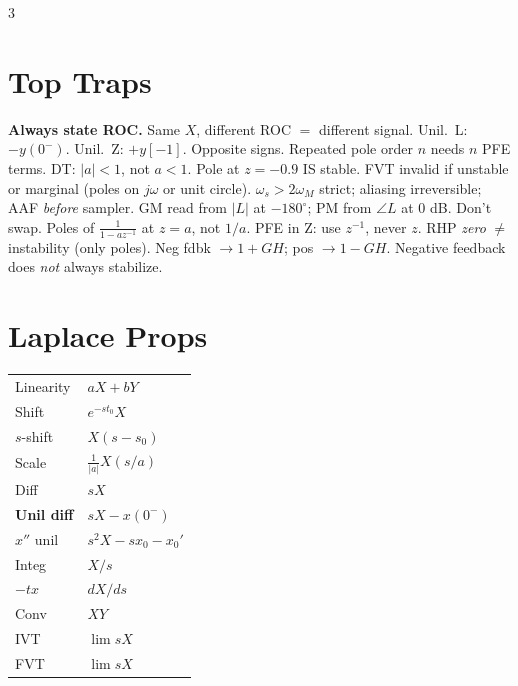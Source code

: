 \documentclass[11pt]{extarticle}
\begin{document}
\begin{paracol}{3}
\section*{Top Traps}
\textbf{Always state ROC.} Same $X$, different ROC $=$ different signal.
Unil.\ L: $\mathbf{-}y(0^-)$. Unil.\ Z: $\mathbf{+}y[-1]$. Opposite signs.
Repeated pole order $n$ needs $n$ PFE terms.
DT: $|a|{<}1$, not $a{<}1$. Pole at $z{=}{-}0.9$ IS stable.
FVT invalid if unstable or marginal (poles on $j\omega$ or unit circle).
$\omega_s>2\omega_M$ strict; aliasing irreversible; AAF \emph{before} sampler.
GM read from $|L|$ at $-180^\circ$; PM from $\angle L$ at 0 dB. Don't swap.
Poles of $\tfrac{1}{1-az^{-1}}$ at $z=a$, not $1/a$.
PFE in Z: use $z^{-1}$, never $z$.
RHP \emph{zero} $\ne$ instability (only poles).
Neg fdbk $\to 1+GH$; pos $\to 1-GH$.
Negative feedback does \emph{not} always stabilize.

\switchcolumn

\section*{Laplace Props}
\begin{tabular}{@{}l l@{}}
\toprule
Linearity & $aX{+}bY$ \\
Shift & $e^{-st_0}X$ \\
$s$-shift & $X(s{-}s_0)$ \\
Scale & $\tfrac{1}{|a|}X(s/a)$ \\
Diff & $sX$ \\
\textbf{Unil diff} & $sX{-}x(0^-)$ \\
$x''$ unil & $s^2X{-}sx_0{-}x_0'$ \\
Integ & $X/s$ \\
$-tx$ & $dX/ds$ \\
Conv & $XY$ \\
IVT & $\lim sX$ \\
FVT & $\lim sX$ \\
\bottomrule
\end{tabular}

\vspace{6pt}

\end{paracol}
\end{document}

